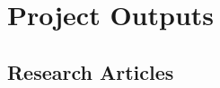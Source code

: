 
\chapter*{Project Outputs}

\section*{Research Articles}

\begin{enumerate}[label={[\arabic*]}]
    \item {}
    \item {}
\end{enumerate}

